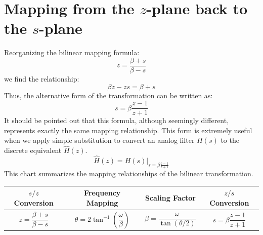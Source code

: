 \documentclass{article}
\begin{document}
\section{Mapping from the \(z\)-plane back to the \(s\)-plane}
Reorganizing the bilinear mapping formula:
\[
z=\frac{\beta+s}{\beta-s}
\]
we find the relationship:
\[
\beta z-zs=\beta+s
\]
Thus, the alternative form of the transformation can be written as:
\[
s=\beta\frac{z-1}{z+1}
\]
It should be pointed out that this formula, although seemingly different, represents exactly the same mapping relationship. This form is extremely useful when we apply simple substitution to convert an analog filter \(H(s)\) to the discrete equivalent \(\hat{H}(z)\).
\[
\hat{H}(z)=H(s)|_{s=\beta\frac{z-1}{z+1}}
\]
This chart summarizes the mapping relationships of the bilinear transformation.
\begin{table}[h]
\centering
\begin{tabular}{|c|c|c|c|}
\hline
\textbf{$s/z$ Conversion} & \textbf{Frequency Mapping} & \textbf{Scaling Factor} & \textbf{$z/s$ Conversion} \\ \hline

$z = \dfrac{\beta+s}{\beta-s}$
&
$\theta = 2\tan^{-1}\!\left(\dfrac{\omega}{\beta}\right)$
&
$\beta = \dfrac{\omega}{\tan(\theta/2)}$
&
$s = \beta \dfrac{z-1}{z+1}$
\\ \hline

\end{tabular}
\end{table}
\end{document}
